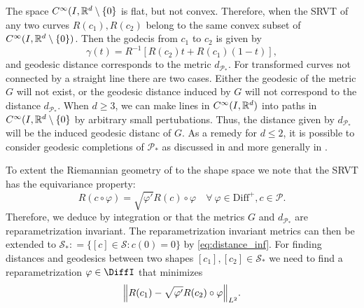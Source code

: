 The space \(C^{\infty}(I, \mathbb{R}^d \setminus \{0\} \) is flat, but not convex. Therefore, when the SRVT of any two curves \(R(c_1), R(c_2)\) belong to the same convex subset of \(C^{\infty}(I, \mathbb{R}^d \setminus \{0\})\). Then the  godecis from \(c_1\) to \(c_2\) is given by 
\begin{equation}
  \gamma(t) = R^{-1}[R(c_2)t +  R(c_1)(1-t)], 
\end{equation}
and geodesic distance corresponds to the metric \(d_{\mathcal{P}_*}\). For transformed curves not connected by a straight line there are two cases. Either the geodesic of the metric \(G\) will not exist, or the geodesic distance induced by \(G\) will not correspond to the  distance \(d_{\mathcal{P}_*}\). When \(d \geq 3\),  we can make lines in \(C^{\infty}(I, \mathbb{R}^d )\) into paths in \(C^{\infty}(I, \mathbb{R}^d \setminus \{0\}\) by arbitrary small pertubations. Thus, the distance given by \(d_{\mathcal{P}_*}\) will be the induced geodesic distanc of \(G\). As a remedy for \(d \leq 2 \), it is possible to consider geodesic completions of \(\mathcal{P}_* \) as discussed in \cite{bruveris1016_srvtexample} and more generally in \cite{bruveris2014_geocomp}. 


To extent the Riemannian geometry of to the shape space we note that the SRVT has the equivariance property: 
\begin{equation}
  R(c \circ \varphi) = \sqrt{\varphi'}R(c) \circ \varphi \quad \forall \ \varphi \in \text{Diff}^+, c \in \mathcal{P}. 
\end{equation}
Therefore, we deduce by integration or \cite[Theomrem 3.1]{bauer2014_rprop} that the metrics \(G\) and \(d_{\mathcal{P}_*}\) are reparametrization invariant. The reparametrization invariant metrics can then be extended to \(\mathcal{S}_* : =  \{[c] \in \mathcal{S}: c(0)=0\}\) by \eqref{eq:distance_inf}. For finding distances and geodesics between two shapes \([c_1], [c_2]\in \mathcal{S}_*\) we need to find a reparametrization \(\varphi \in \DiffI\) that minimizes 
\begin{equation} \label{eq:srvt_reparam}
  \norm{R(c_1) - \sqrt{\varphi'} R(c_2)\circ \varphi}_{L^2}. 
\end{equation}

